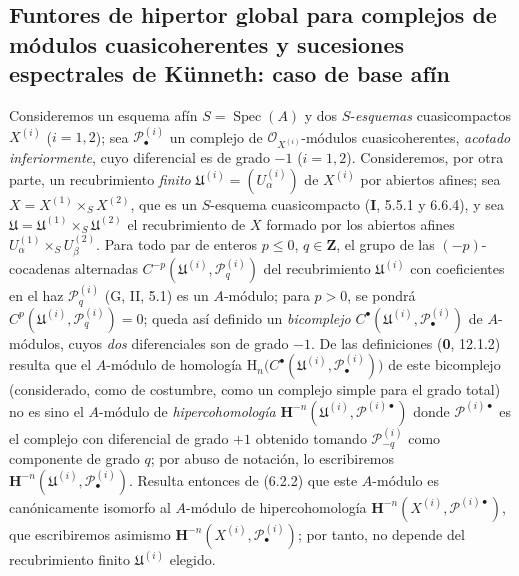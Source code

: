 \subsection{Funtores de hipertor global para complejos de módulos
cuasicoherentes y sucesiones espectrales de Künneth: caso de base afín}
\label{subsection:III.6.6}
\label{subsection:III.6.6.fr}

\begin{env}[6.6.1]
\label{III.6.6.1}
Consideremos un esquema afín $S=\operatorname{Spec}(A)$ y dos $S$-\emph{esquemas}
cuasicompactos $X^{(i)}$ ($i=1,2$); sea $\mathscr P_\bullet^{(i)}$ un complejo
de $\mathscr O_{X^{(i)}}$-módulos cuasicoherentes, \emph{acotado inferiormente},
cuyo diferencial es de grado $-1$ ($i=1,2$). Consideremos, por otra parte, un
recubrimiento \emph{finito}
$\mathfrak U^{(i)}=(U_\alpha^{(i)})$ de $X^{(i)}$ por abiertos afines; sea
$X=X^{(1)}\times_S X^{(2)}$,
que es un $S$-esquema cuasicompacto (\textbf I, 5.5.1 y 6.6.4), y sea
$\mathfrak U=\mathfrak U^{(1)}\times_S\mathfrak U^{(2)}$ el recubrimiento de
$X$ formado por los abiertos afines
$U_\alpha^{(1)}\times_S U_\beta^{(2)}$. Para todo par de enteros
$p\leqslant0$, $q\in\mathbf Z$, el grupo de las $(-p)$-cocadenas alternadas
$C^{-p}(\mathfrak U^{(i)},\mathscr P_q^{(i)})$
del recubrimiento $\mathfrak U^{(i)}$ con coeficientes en el haz
$\mathscr P_q^{(i)}$ (G, II, 5.1) es un $A$-módulo; para $p>0$, se pondrá
$C^p(\mathfrak U^{(i)},\mathscr P_q^{(i)})=0$; queda así definido un
\emph{bicomplejo}
$C^\bullet(\mathfrak U^{(i)},\mathscr P_\bullet^{(i)})$
de $A$-módulos, cuyos \emph{dos} diferenciales son de grado $-1$. De las
definiciones (\textbf{0}, 12.1.2) resulta que el $A$-módulo de homología
$\mathrm H_n\bigl(C^\bullet
(\mathfrak U^{(i)},\mathscr P_\bullet^{(i)})\bigr)$
de este bicomplejo (considerado, como de costumbre, como un complejo simple
para el grado total) no es sino el $A$-módulo de \emph{hipercohomología}
$\mathbf H^{-n}
(\mathfrak U^{(i)},\mathscr P^{(i)\bullet})$
donde $\mathscr P^{(i)\bullet}$ es el complejo con diferencial de grado $+1$
obtenido tomando $\mathscr P_{-q}^{(i)}$ como componente de grado $q$; por
abuso de notación, lo escribiremos
$\mathbf H^{-n}(\mathfrak U^{(i)},\mathscr P_\bullet^{(i)})$. Resulta entonces
de (6.2.2) que este $A$-módulo es canónicamente isomorfo al $A$-módulo de
hipercohomología
$\mathbf H^{-n}(X^{(i)},\mathscr P^{(i)\bullet})$, que escribiremos asimismo
$\mathbf H^{-n}(X^{(i)},\mathscr P_\bullet^{(i)})$; por tanto, no depende del
recubrimiento finito $\mathfrak U^{(i)}$ elegido.
\end{env}

